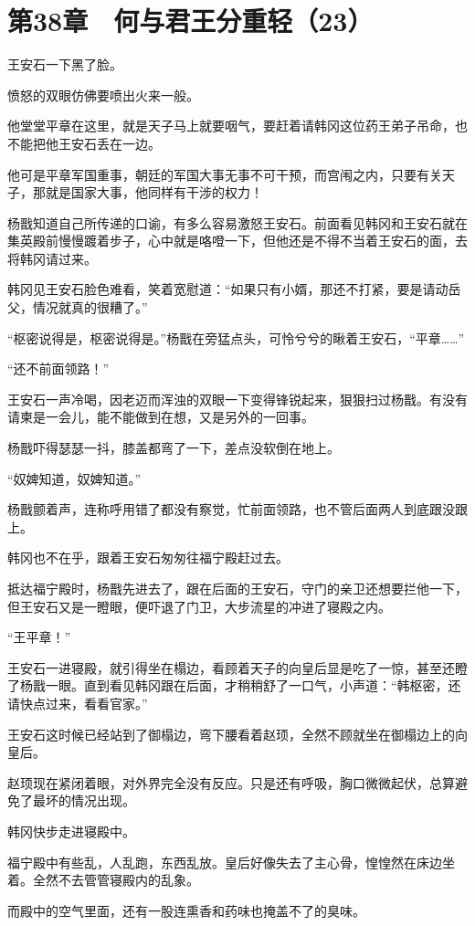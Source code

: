 \section{第38章　何与君王分重轻（23）}

王安石一下黑了脸。

愤怒的双眼仿佛要喷出火来一般。

他堂堂平章在这里，就是天子马上就要咽气，要赶着请韩冈这位药王弟子吊命，也不能把他王安石丢在一边。

他可是平章军国重事，朝廷的军国大事无事不可干预，而宫闱之内，只要有关天子，那就是国家大事，他同样有干涉的权力！

杨戬知道自己所传递的口谕，有多么容易激怒王安石。前面看见韩冈和王安石就在集英殿前慢慢踱着步子，心中就是咯噔一下，但他还是不得不当着王安石的面，去将韩冈请过来。

韩冈见王安石脸色难看，笑着宽慰道：“如果只有小婿，那还不打紧，要是请动岳父，情况就真的很糟了。”

“枢密说得是，枢密说得是。”杨戬在旁猛点头，可怜兮兮的瞅着王安石，“平章……”

“还不前面领路！”

王安石一声冷喝，因老迈而浑浊的双眼一下变得锋锐起来，狠狠扫过杨戬。有没有请柬是一会儿，能不能做到在想，又是另外的一回事。

杨戬吓得瑟瑟一抖，膝盖都弯了一下，差点没软倒在地上。

“奴婢知道，奴婢知道。”

杨戬颤着声，连称呼用错了都没有察觉，忙前面领路，也不管后面两人到底跟没跟上。

韩冈也不在乎，跟着王安石匆匆往福宁殿赶过去。

抵达福宁殿时，杨戬先进去了，跟在后面的王安石，守门的亲卫还想要拦他一下，但王安石又是一瞪眼，便吓退了门卫，大步流星的冲进了寝殿之内。

“王平章！”

王安石一进寝殿，就引得坐在榻边，看顾着天子的向皇后显是吃了一惊，甚至还瞪了杨戬一眼。直到看见韩冈跟在后面，才稍稍舒了一口气，小声道：“韩枢密，还请快点过来，看看官家。”

王安石这时候已经站到了御榻边，弯下腰看着赵顼，全然不顾就坐在御榻边上的向皇后。

赵顼现在紧闭着眼，对外界完全没有反应。只是还有呼吸，胸口微微起伏，总算避免了最坏的情况出现。

韩冈快步走进寝殿中。

福宁殿中有些乱，人乱跑，东西乱放。皇后好像失去了主心骨，惶惶然在床边坐着。全然不去管管寝殿内的乱象。

而殿中的空气里面，还有一股连熏香和药味也掩盖不了的臭味。

